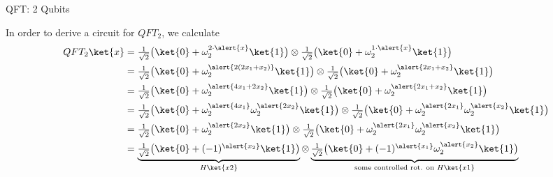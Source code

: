 \documentclass{beamer}
\begin{document}
\begin{frame}{QFT: 2 Qubits}

        In order to derive a circuit for $QFT_2$, we calculate
        \begin{align*}
                QFT_2 \ket{x} & = \textstyle{\frac{1}{\sqrt{2}} \big (\ket{0} 
                + \omega_2^{2 \cdot \alert{x}} \ket{1} \big )}   \otimes
                \textstyle{\frac{1}{\sqrt{2}} \big (\ket{0} 
                + \omega_2^{1 \cdot \alert{x}} \ket{1} \big )} \\
                              & =
                              \textstyle{\frac{1}{\sqrt{2}} \big (\ket{0} 
                              + \omega_2^{\alert{2(2x_1 + x_2)}} \ket{1} \big )}\otimes
                              \textstyle{\frac{1}{\sqrt{2}} \big (\ket{0} 
                              + \omega_2^{\alert{2x_1 + x_2}} \ket{1} \big )} 
                              \\
                              & =
                              \textstyle{\frac{1}{\sqrt{2}} \big (\ket{0} 
                              + \omega_2^{\alert{4x_1 + 2 x_2}} \ket{1} \big )}\otimes
                              \textstyle{\frac{1}{\sqrt{2}} \big (\ket{0} 
                              + \omega_2^{\alert{2x_1 + x_2}} \ket{1} \big )} 
                              \\
                              & =
                              \textstyle{\frac{1}{\sqrt{2}} \big (\ket{0} 
                              + \omega_2^{\alert{4x_1}} \omega_2^{\alert{2 x_2}} \ket{1} \big )}
                              \otimes
                              \textstyle{\frac{1}{\sqrt{2}} \big (\ket{0} 
                              + \omega_2^{\alert{2x_1}} \omega_2^{\alert{x_2}} \ket{1} \big )} 
                              \\
                              & =
                              \textstyle{\frac{1}{\sqrt{2}} \big (\ket{0} 
                              + \omega_2^{\alert{2 x_2}} \ket{1} \big )}
                              \otimes
                              \textstyle{\frac{1}{\sqrt{2}} \big (\ket{0} 
                              + \omega_2^{\alert{2x_1}} \omega_2^{\alert{x_2}} \ket{1} \big )} 
                              \\
                              & =
                              \underbrace{\textstyle{\frac{1}{\sqrt{2}} \big (\ket{0} 
                              + (-1)^{\alert{x_2}} \ket{1} \big )}}_{H\ket{x2}}
                              \otimes
                              \underbrace{\textstyle{\frac{1}{\sqrt{2}} \big (\ket{0} 
                              + (-1)^{\alert{x_1}} \omega_2^{\alert{x_2}} \ket{1} \big )}}_{
                              \text{some controlled rot. on } H\ket{x1}}
        \end{align*}

\end{frame}
\end{document}
